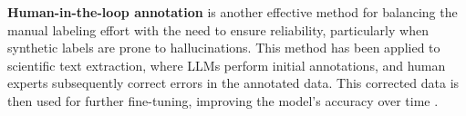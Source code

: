\documentclass{article}
\begin{document}
\textbf{Human-in-the-loop annotation} is another effective method for balancing the manual labeling effort with the need to ensure reliability, particularly when synthetic labels are prone to hallucinations. This method has been applied to scientific text extraction, where LLMs perform initial annotations, and human experts subsequently correct errors in the annotated data. This corrected data is then used for further fine-tuning, improving the model’s accuracy over time \cite{Dagdelen2024}. 









\end{document}
